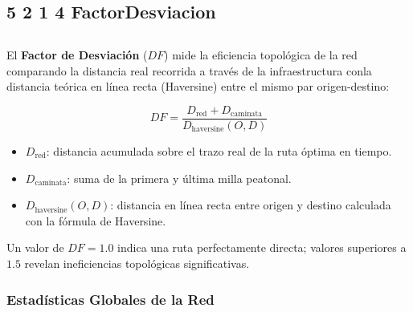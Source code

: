 \subsection*{5 2 1 4 FactorDesviacion}
\subsection{}
\label{subsec:detour-factor}

El \textbf{Factor de Desviación} ($DF$) mide la eficiencia topológica de la
red comparando la distancia real recorrida a través de la infraestructura
con\DIFdelbegin {}\DIFdelend  la distancia teórica en línea recta (Haversine) entre el mismo par
origen-destino:

\begin{equation}
    DF = \frac{D_{\text{red}} + D_{\text{caminata}}}{D_{\text{haversine}}(O, D)}
    \label{eq:detour-factor-res}
\end{equation}

\begin{itemize}
    \item $D_{\text{red}}$: distancia acumulada sobre el trazo real de la ruta
    óptima en tiempo.
    \item $D_{\text{caminata}}$: suma de la primera y última milla peatonal.
    \item $D_{\text{haversine}}(O,D)$: distancia en línea recta entre origen y
    destino calculada con la fórmula de Haversine.
\end{itemize}

Un valor de $DF = 1.0$ indica una ruta perfectamente directa; valores superiores
a $1.5$ revelan ineficiencias topológicas significativas.

\subsubsection{Estadísticas Globales de la Red}
\label{subsubsec:df-estadisticas}

